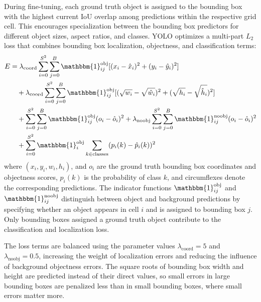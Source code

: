 During fine-tuning, each ground truth object is assigned to the bounding box with the highest current IoU overlap among predictions within the respective grid cell. This encourages specialization between the bounding box predictors for different object sizes, aspect ratios, and classes. YOLO optimizes a multi-part $L_2$ loss that combines bounding box localization, objectness, and classification terms:
\begin{equation}
\begin{split}
    E &= \lambda_{\text{coord}} \sum_{i = 0}^{S^2} \sum_{j = 0}^B \mathbbm{1}_{ij}^\text{obj} [(x_i - \hat{x}_i)^2 + (y_i - \hat{y}_i)^2] \\
    &\quad + \lambda_{\text{coord}} \sum_{i = 0}^{S^2} \sum_{j = 0}^B \mathbbm{1}_{ij}^\text{obj} [(\sqrt{w_i} - \sqrt{\hat{w}_i})^2 + (\sqrt{h_i} - \sqrt{\hat{h}_i})^2] \\
    &\quad + \sum_{i = 0}^{S^2} \sum_{j = 0}^B \mathbbm{1}_{ij}^\text{obj} (o_i - \hat{o}_i)^2 + \lambda_{\text{noobj}} \sum_{i = 0}^{S^2} \sum_{j = 0}^B \mathbbm{1}_{ij}^\text{noobj} (o_i - \hat{o}_i)^2 \\
    &\quad + \sum_{i = 0}^{S^2} \mathbbm{1}_i^\text{obj} \sum_{k \in \text{classes}} (p_i(k) - \hat{p}_i(k))^2
\end{split}
\end{equation}
where $(x_i, y_i, w_i, h_i)$, and $o_i$ are the ground truth bounding box coordinates and objectness scores, $p_i(k)$ is the probability of class $k$, and circumflexes denote the corresponding predictions. The indicator functions $\mathbbm{1}_{ij}^\text{obj}$ and $\mathbbm{1}_{ij}^\text{noobj}$ distinguish between object and background predictions by specifying whether an object appears in cell $i$ and is assigned to bounding box $j$. Only bounding boxes assigned a ground truth object contribute to the classification and localization loss.

The loss terms are balanced using the parameter values $\lambda_{\text{coord}} = 5$ and $\lambda_{\text{noobj}} = 0.5$, increasing the weight of localization errors and reducing the influence of background objectness errors. The square roots of bounding box width and height are predicted instead of their direct values, so small errors in large bounding boxes are penalized less than in small bounding boxes, where small errors matter more.~\cite{Redmon2016}


